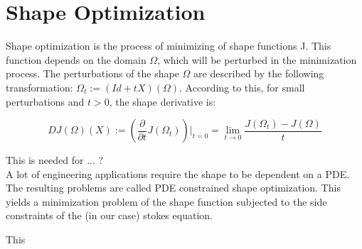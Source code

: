 \section{Shape Optimization}

Shape optimization is the process of minimizing of shape functions J. This function depends on the domain $\Omega$, which will be perturbed in the minimization process. 
The perturbations of the shape $\Omega$ are described by the following transformation: $\Omega_t := (Id + tX )(\Omega)$. According to this, for small perturbations and $t > 0$, the shape derivative is: \cite{fully_semi_paper_sturm}

\begin{equation}
	DJ(\Omega)(X) := \left(\frac{\partial}{\partial t}J(\Omega_t)\right)\bigg\rvert_{t=0} = \lim_{t \to 0} \frac{J(\Omega_t)-J(\Omega)}{t}
\end{equation}

This is needed for ... ? \\

A lot of engineering applications require the shape to be dependent on a PDE. The resulting problems are called PDE constrained shape optimization. This yields a minimization problem of the shape function subjected to the side constraints of the (in our case) stokes equation.


This 